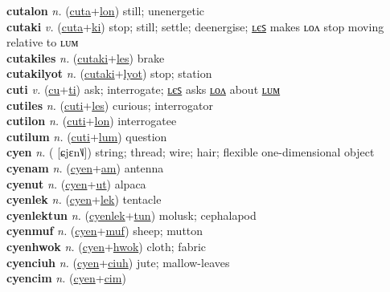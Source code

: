 \textbf{cutalon} \textit{n.} (\hyperref[cuta]{cuta}+\hyperref[lon]{lon})
still; unenergetic \label{cutalon} \\
\textbf{cutaki} \textit{v.} (\hyperref[cuta]{cuta}+\hyperref[ki]{ki})
stop; still; settle; deenergise; \hyperref[cutakiles]{ʟєꜱ} makes ʟᴏᴧ stop moving relative to ʟᴜᴍ \label{cutaki} \\
\textbf{cutakiles} \textit{n.} (\hyperref[cutaki]{cutaki}+\hyperref[les]{les})
brake \label{cutakiles} \\
\textbf{cutakilyot} \textit{n.} (\hyperref[cutaki]{cutaki}+\hyperref[lyot]{lyot})
stop; station \label{cutakilyot} \\
\textbf{cuti} \textit{v.} (\hyperref[cu]{cu}+\hyperref[ti]{ti})
ask; interrogate; \hyperref[cutiles]{ʟєꜱ} asks \hyperref[cutilon]{ʟᴏᴧ} about \hyperref[cutilum]{ʟᴜᴍ} \label{cuti} \\
\textbf{cutiles} \textit{n.} (\hyperref[cuti]{cuti}+\hyperref[les]{les})
curious; interrogator \label{cutiles} \\
\textbf{cutilon} \textit{n.} (\hyperref[cuti]{cuti}+\hyperref[lon]{lon})
interrogatee \label{cutilon} \\
\textbf{cutilum} \textit{n.} (\hyperref[cuti]{cuti}+\hyperref[lum]{lum})
question \label{cutilum} \\
\textbf{cyen} \textit{n.} ( [ɕjɛn˥˩])
string; thread; wire; hair; flexible one-dimensional object \label{cyen} \\
\textbf{cyenam} \textit{n.} (\hyperref[cyen]{cyen}+\hyperref[am]{am})
antenna \label{cyenam} \\
\textbf{cyenut} \textit{n.} (\hyperref[cyen]{cyen}+\hyperref[ut]{ut})
alpaca \label{cyenut} \\
\textbf{cyenlek} \textit{n.} (\hyperref[cyen]{cyen}+\hyperref[lek]{lek})
tentacle \label{cyenlek} \\
\textbf{cyenlektun} \textit{n.} (\hyperref[cyenlek]{cyenlek}+\hyperref[tun]{tun})
molusk; cephalapod \label{cyenlektun} \\
\textbf{cyenmuf} \textit{n.} (\hyperref[cyen]{cyen}+\hyperref[muf]{muf})
sheep; mutton \label{cyenmuf} \\
\textbf{cyenhwok} \textit{n.} (\hyperref[cyen]{cyen}+\hyperref[hwok]{hwok})
cloth; fabric \label{cyenhwok} \\
\textbf{cyenciuh} \textit{n.} (\hyperref[cyen]{cyen}+\hyperref[ciuh]{ciuh})
jute; mallow-leaves \label{cyenciuh} \\
\textbf{cyencim} \textit{n.} (\hyperref[cyen]{cyen}+\hyperref[cim]{cim})
